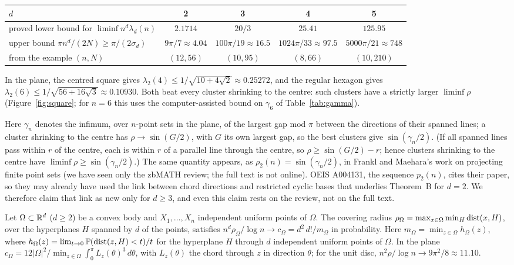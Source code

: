 \documentclass[11pt]{article}
\begin{document}
\begin{center}
\small
\begin{tabular}{p{4.3cm}cccc}
\toprule
$d$ & 2 & 3 & 4 & 5\\
\midrule
proved lower bound for $\liminf n^d\lambda_d(n)$ & $2.1714$ & $20/3$ & $25.41$ & $125.95$\\
upper bound $\pi n^d/(2N)\ge\pi/(2\sigma_d)$ & $9\pi/7\approx4.04$ & $100\pi/19\approx16.5$ &
$1024\pi/33\approx97.5$ & $5000\pi/21\approx748$\\
from the example $(n,N)$ & $(12,56)$ & $(10,95)$ & $(8,66)$ & $(10,210)$\\
\bottomrule
\end{tabular}
\end{center}

\begin{thmD}
In the plane, the centred square gives $\lambda_2(4)\le 1/\sqrt{10+4\sqrt2}\approx0.25272$, and the
regular hexagon gives $\lambda_2(6)\le1/\sqrt{56+16\sqrt3}\approx0.10930$. Both beat every cluster
shrinking to the centre: such clusters have a strictly larger $\liminf\rho$ (Figure~\ref{fig:square}; for $n=6$ this
uses the computer-assisted bound on $\gamma_6$ of Table~\ref{tab:gamma}).
\end{thmD}

Here $\gamma_n$ denotes the infimum, over $n$-point sets in the plane, of the largest gap mod $\pi$
between the directions of their spanned lines; a cluster shrinking to the centre has
$\rho\to\sin(G/2)$, with $G$ its own largest gap, so the best clusters give $\sin(\gamma_n/2)$. (If all spanned lines pass within $r$ of the centre, each
is within $r$ of a parallel line through the centre, so $\rho\ge\sin(G/2)-r$; hence clusters shrinking to
the centre have $\liminf\rho\ge\sin(\gamma_n/2)$.) The
same quantity appears, as $\rho_2(n)=\sin(\gamma_n/2)$, in Frankl and Maehara's work on projecting
finite point sets \cite{FM} (we have seen only the zbMATH review; the full text is not online). OEIS
A004131, the sequence $p_2(n)$, cites their paper, so they may already have used the link between chord
directions and restricted cyclic bases that underlies Theorem~B for $d=2$. We therefore claim that link
as new only for $d\ge3$, and even this claim rests on the review, not on the full text.

\begin{thmE}
Let $\Omega\subset\mathbb{R}^d$ ($d\ge2$) be a convex body and $X_1,\dots,X_n$ independent uniform points of
$\Omega$. The covering radius $\rho_\Omega=\max_{x\in\Omega}\min_H\operatorname{dist}(x,H)$, over the hyperplanes $H$ spanned by
$d$ of the points, satisfies $n^d\rho_\Omega/\log n\to c_\Omega=d^2\,d!/m_\Omega$ in probability. Here
$m_\Omega=\min_{z\in\Omega}h_\Omega(z)$, where $h_\Omega(z)=\lim_{t\to0}\mathbb{P}(\operatorname{dist}(z,H)<t)/t$ for the hyperplane $H$ through
$d$ independent uniform points of $\Omega$. In the plane
$c_\Omega=12|\Omega|^2/\min_{z\in\Omega}\int_0^\pi L_z(\theta)^3\,d\theta$, with $L_z(\theta)$ the chord through $z$ in direction
$\theta$; for the unit disc, $n^2\rho/\log n\to9\pi^2/8\approx11.10$.
\end{thmE}
\end{document}
